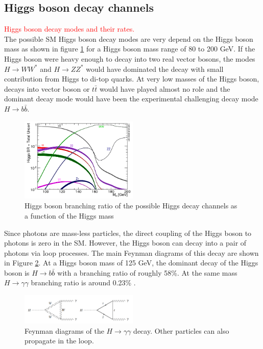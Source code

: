 \subsection{Higgs boson decay channels}
\label{chap1:EWSB:HD}
\textcolor{red}{Higgs boson decay modes and their rates. \\}
The possible SM Higgs boson decay modes are very depend on the Higgs boson mass as shown in figure \ref{fig:chap1:EWSB:BR} for a Higgs boson mass range of 80 to 200 GeV. If the Higgs boson were heavy enough to decay into two real vector bosons, the modes $H\rightarrow WW^*$ and $ H\rightarrow ZZ^*$ would have dominated the decay with small contribution from Higgs to di-top quarks. At very low masses of the Higgs boson, decays into vector boson or $t\bar{t}$ would have played almost no role and the dominant decay mode would have been the experimental challenging decay mode $H\rightarrow b\bar{b}$.
\begin{figure}[h!]
    \centering
    \includegraphics[width=0.5\textwidth]{Ch1/Img/Higgs_Br.png}
    \caption{Higgs boson branching ratio of the possible Higgs decay channels as a function of the Higgs mass \cite{HiggsBR}}
    \label{fig:chap1:EWSB:BR}
\end{figure}
Since photons are mass-less particles, the direct coupling of the Higgs boson to photons is zero in the SM. However, the Higgs boson can decay into a pair of photons via loop processes. The main Feynman diagrams of this decay are shown in Figure \ref{fig:chap1:EWSB:Hgg}. 
At a Higgs boson mass of 125 GeV, the dominant decay of the Higgs boson is $H \rightarrow b\bar{b}$ with a branching ratio of roughly 58\%. At the same mass $H\rightarrow\gamma\gamma$ branching ratio is around 0.23\% \cite{HXSWG}.
\begin{figure}[H]
    \centering
    \includegraphics[width=0.5\textwidth]{Ch1/Img/H_to_gammagamma.png}
    \caption{Feynman diagrams of the $H\rightarrow\gamma\gamma$ decay. Other particles can also propagate in the loop.}
    \label{fig:chap1:EWSB:Hgg}
\end{figure}

